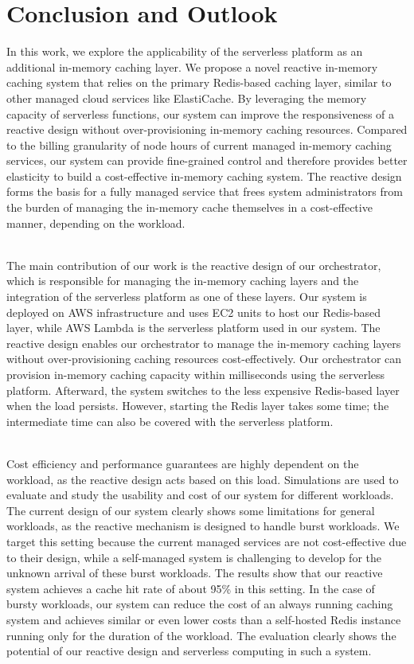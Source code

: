 \chapter{Conclusion and Outlook}
\label{cha:conclusion_and_outlook}
In this work, we explore the applicability of the serverless platform as an additional in-memory caching layer. We propose a novel reactive in-memory caching system that relies on the primary Redis-based caching layer, similar to other managed cloud services like ElastiCache. By leveraging the memory capacity of serverless functions, our system can improve the responsiveness of a reactive design without over-provisioning in-memory caching resources. Compared to the billing granularity of node hours of current managed in-memory caching services, our system can provide fine-grained control and therefore provides better elasticity to build a cost-effective in-memory caching system. The reactive design forms the basis for a fully managed service that frees system administrators from the burden of managing the in-memory cache themselves in a cost-effective manner, depending on the workload.

~\\
The main contribution of our work is the reactive design of our orchestrator, which is responsible for managing the in-memory caching layers and the integration of the serverless platform as one of these layers. Our system is deployed on AWS infrastructure and uses EC2 units to host our Redis-based layer, while AWS Lambda is the serverless platform used in our system. The reactive design enables our orchestrator to manage the in-memory caching layers without over-provisioning caching resources cost-effectively. Our orchestrator can provision in-memory caching capacity within milliseconds using the serverless platform. Afterward, the system switches to the less expensive Redis-based layer when the load persists. However, starting the Redis layer takes some time; the intermediate time can also be covered with the serverless platform.

~\\
Cost efficiency and performance guarantees are highly dependent on the workload, as the reactive design acts based on this load. Simulations are used to evaluate and study the usability and cost of our system for different workloads. The current design of our system clearly shows some limitations for general workloads, as the reactive mechanism is designed to handle burst workloads. We target this setting because the current managed services are not cost-effective due to their design, while a self-managed system is challenging to develop for the unknown arrival of these burst workloads. The results show that our reactive system achieves a cache hit rate of about 95\% in this setting. In the case of bursty workloads, our system can reduce the cost of an always running caching system and achieves similar or even lower costs than a self-hosted Redis instance running only for the duration of the workload. The evaluation clearly shows the potential of our reactive design and serverless computing in such a system. 

